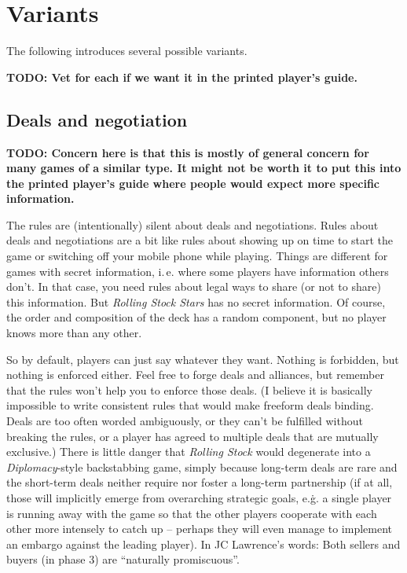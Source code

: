 \documentclass[10pt,final]{report}
\begin{document}
\chapter{Variants}
\begin{multicols}{2}

The following introduces several possible variants.

\textbf{TODO: Vet for each if we want it in the printed player's guide.}

\section{Deals and negotiation}
\label{deals}

\textbf{TODO: Concern here is that this is mostly of general concern
  for many games of a similar type. It might not be worth it to put
  this into the printed player's guide where people would expect more
  specific information.}

The rules are (intentionally) silent about deals and
negotiations. Rules about deals and negotiations are a bit like rules
about showing up on time to start the game or switching off your
mobile phone while playing. Things are different for games with secret
information, i.\,e. where some players have information others
don't. In that case, you need rules about legal ways to share (or not
to share) this information. But \emph{Rolling Stock Stars} has no secret
information. Of course, the order and composition of the deck has a
random component, but no player knows more than any other.

So by default, players can just say whatever they want. Nothing is
forbidden, but nothing is enforced either. Feel free to forge deals
and alliances, but remember that the rules won't help you to enforce
those deals. (I believe it is basically impossible to write consistent
rules that would make freeform deals binding. Deals are too often
worded ambiguously, or they can't be fulfilled without breaking the
rules, or a player has agreed to multiple deals that are mutually
exclusive.) There is little danger that \emph{Rolling Stock} would
degenerate into a \emph{Diplomacy}-style backstabbing game, simply
because long-term deals are rare and the short-term deals neither
require nor foster a long-term partnership (if at all, those will
implicitly emerge from overarching strategic goals, e.\.g. a single
player is running away with the game so that the other players
cooperate with each other more intensely to catch up -- perhaps they
will even manage to implement an embargo against the leading
player). In JC Lawrence's words: Both sellers and buyers (in phase 3)
are ``naturally promiscuous''.


\end{multicols}
\end{document}

